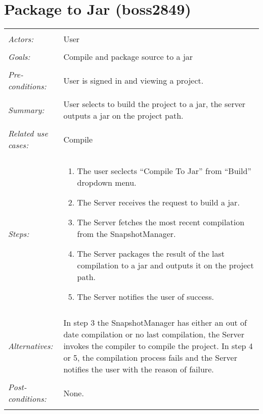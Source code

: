 \documentclass[11pt]{report}
\begin{document}
\section{Package to Jar (boss2849)}
\begin{tabular}{ p{2cm} p{12cm} }
 \hline
 \\
 \textit{Actors:} & User \\ 
 \\
 \textit{Goals:} & Compile and package source to a jar\\
 \\
 \textit{Pre-conditions:} & User is signed in and viewing a project. \\
 \\
 \textit{Summary:} & User selects to build the project to a jar, the server outputs a jar on the project path. \\
 \\
 \textit{Related use cases:} & Compile \\ 
 \\
 \textit{Steps:} & \begin{enumerate}
  \item The user seclects ``Compile To Jar'' from ``Build'' dropdown menu.
  \item The Server receives the request to build a jar.
  \item The Server fetches the most recent compilation from the SnapshotManager.
  \item The Server packages the result of the last compilation to a jar and outputs it on the project path.
  \item The Server notifies the user of success.
 \end{enumerate} \\
 \\
 \textit{Alternatives:} & In step 3 the SnapshotManager has either an out of date compilation or no last compilation, the Server invokes the compiler to compile the project. In step 4 or 5, the compilation process fails and the Server notifies the user with the reason of failure. \\
 \\
 \textit{Post-conditions:} & None. \\
 \\
\hline
\end{tabular}
\end{document}
